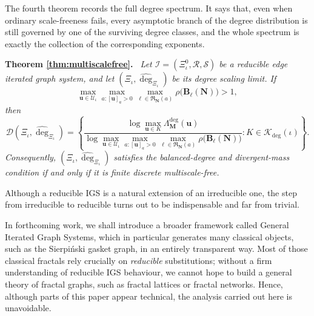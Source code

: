 \documentclass[12pt]{iopart}
\newenvironment{restated}[1]{%
  \par\noindent\textbf{Theorem #1.}\itshape\ }%
  {\par}
\begin{document}
The fourth theorem records the full degree spectrum.
It says that, even when ordinary scale-freeness fails, every asymptotic branch of the degree distribution is still governed by one of the surviving degree classes, and the whole spectrum is exactly the collection of the corresponding exponents.

\begin{restated}{\ref{thm:multiscalefree}}
Let $\mathscr I=(\Xi_\iota^{0},\mathcal R,\mathcal S)$ be a reducible edge iterated graph system, and let $(\Xi_\iota,\hat{\deg}_{\Xi_\iota})$ be its degree scaling limit.
If
\[
\max_{\mathbf u\in\mathcal U_\iota}
\max_{a:[\mathbf u]_a>0}
\max_{\ell\in\mathfrak R_{\mathbf N}(a)}
\rho\big(\mathbf B_\ell(\mathbf N)\big)
>1,
\]
then
\[
\mathscr D(\Xi_\iota,\hat{\deg}_{\Xi_\iota})
=
\left\{
\frac{
\displaystyle
\log \max_{\mathbf u\in K}
\Lambda_{\mathbf M}^{\deg}(\mathbf u)
}{
\displaystyle
\log \max_{\mathbf u\in\mathcal U_\iota}
\max_{a:[\mathbf u]_a>0}
\max_{\ell\in\mathfrak R_{\mathbf N}(a)}
\rho\big(\mathbf B_\ell(\mathbf N)\big)
}
:
K\in\mathscr K_{\deg}(\iota)
\right\}.
\]
Consequently, $(\Xi_\iota,\hat{\deg}_{\Xi_\iota})$ satisfies the balanced-degree and divergent-mass condition if and only if it is finite discrete multiscale-free.
\end{restated}

\bigskip

Although a reducible IGS is a natural extension of an irreducible one, 
the step from irreducible to reducible turns out to be indispensable and far from trivial.

In forthcoming work, we shall introduce a broader framework called General Iterated Graph Systems, 
which in particular generates many classical objects, such as the Sierpiński gasket graph, 
in an entirely transparent way. 
Most of those classical fractals rely crucially on {\em reducible} substitutions; without a firm understanding of reducible IGS behaviour, we cannot hope to build a general theory of fractal graphs, such as fractal lattices or fractal networks. 
Hence, although parts of this paper appear technical, the analysis carried out here is unavoidable.
\end{document}
